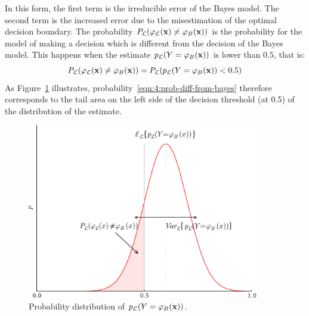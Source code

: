 In this form, the first term is the irreducible error of the Bayes model. The
second term is the increased error due to the misestimation of the optimal
decision boundary. The probability $P_{\cal L}(\varphi_{\cal L}(\mathbf{x})\neq
\varphi_B(\mathbf{x}))$  is the probability for the model of making a decision
which is different from the decision of the Bayes model. This happens
when the estimate $p_{\cal L}(Y=\varphi_B(\mathbf{x}))$ is lower
than $0.5$, that is:
\begin{equation}\label{eqn:4:prob-diff-from-bayes}
P_{\cal L}(\varphi_{\cal L}(\mathbf{x})\neq \varphi_B(\mathbf{x})) = P_{\cal L}(p_{\cal L}(Y=\varphi_B(\mathbf{x})) < 0.5)
\end{equation}
As Figure~\ref{fig:estimate-distribution} illustrates, probability~\ref{eqn:4:prob-diff-from-bayes}
therefore corresponds to the tail area on the left side
of the decision threshold (at 0.5) of the distribution of the estimate.

\begin{figure}
    \centering
    \includegraphics[width=0.9\textwidth]{figures/ch4_estimate_distribution.pdf}
    \caption{Probability distribution of $p_{\cal L}(Y=\varphi_B(\mathbf{x}))$.}
    \label{fig:estimate-distribution}
\end{figure}

